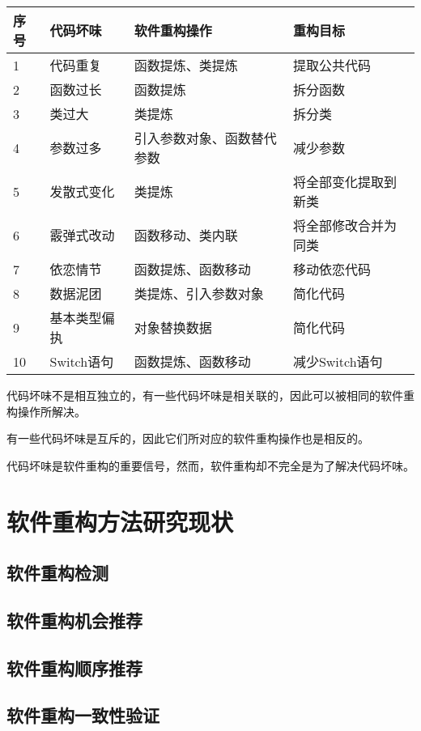 \begin{center}
\label{fig:badsmell}
\begin{tabular}{|l|l|l|l|}
\hline
序号 & 代码坏味 & 软件重构操作 & 重构目标\\ \hline
1 & 代码重复 & 函数提炼、类提炼 & 提取公共代码\\ \hline
2 & 函数过长 & 函数提炼 & 拆分函数\\ \hline
3 & 类过大 & 类提炼 & 拆分类\\ \hline
4 & 参数过多 & 引入参数对象、函数替代参数 & 减少参数\\ \hline
5 & 发散式变化& 类提炼 & 将全部变化提取到新类\\ \hline
6 & 霰弹式改动& 函数移动、类内联 & 将全部修改合并为同类\\ \hline
7 & 依恋情节& 函数提炼、函数移动 & 移动依恋代码\\ \hline
8 & 数据泥团& 类提炼、引入参数对象 & 简化代码\\ \hline
9 & 基本类型偏执& 对象替换数据 & 简化代码 \\ \hline
10 & Switch语句 & 函数提炼、函数移动 & 减少Switch语句\\ \hline
\end{tabular}
\end{center}

代码坏味不是相互独立的，有一些代码坏味是相关联的，因此可以被相同的软件重构操作所解决。

有一些代码坏味是互斥的，因此它们所对应的软件重构操作也是相反的。

代码坏味是软件重构的重要信号，然而，软件重构却不完全是为了解决代码坏味。


\section{软件重构方法研究现状}
\subsection{软件重构检测}
\subsection{软件重构机会推荐}
\subsection{软件重构顺序推荐}
\subsection{软件重构一致性验证}

